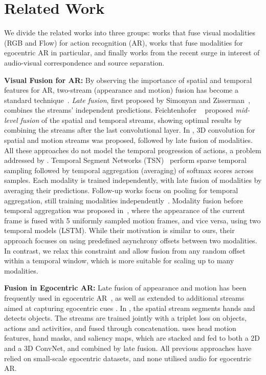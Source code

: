 \documentclass[10pt,twocolumn,letterpaper]{article}
\begin{document}
\section{Related Work}

We divide the related works into three groups: works that fuse visual modalities (RGB and Flow) for action recognition (AR), works that fuse modalities for egocentric AR in particular, and finally works from the recent surge in interest of audio-visual correspondence and source separation.

\noindent\textbf{Visual Fusion for AR:} By observing the importance of spatial and temporal features for AR, 
two-stream (appearance and motion) fusion has become a standard technique~\cite{NIPS2014_5353, Feichtenhofer_2016_CVPR, TSN2016ECCV}.
\textit{Late fusion}, first proposed by Simonyan and Zisserman~\cite{NIPS2014_5353},  combines the streams' independent predictions. Feichtenhofer \etal~\cite{Feichtenhofer_2016_CVPR} proposed \textit{mid-level fusion} of the spatial and temporal streams, showing optimal results by combining the streams after the last convolutional layer.
In \cite{Carreira_2017_CVPR}, 3D convolution for spatial and motion streams was proposed, followed by late fusion of modalities. 
All these approaches do not model the temporal progression of actions, 
a problem addressed by \cite{TSN2016ECCV}.
Temporal Segment Networks (TSN)~\cite{TSN2016ECCV} perform sparse temporal sampling followed by temporal aggregation (averaging) of softmax scores across samples. 
Each modality is trained independently, 
with late fusion of modalities by averaging their predictions.
Follow-up works focus on pooling for temporal aggregation, still training modalities independently~\cite{Zhou_2018_ECCV,Girdhar_2017_CVPR}.
Modality fusion before temporal aggregation was proposed in~\cite{async_fusion}, where the appearance of the current frame is fused with 5 uniformly sampled motion frames, and vice versa, using two temporal models (LSTM).
While their motivation is similar to ours, their approach focuses on using predefined asynchrony offsets between two modalities. In contrast, we relax this constraint and allow fusion from any random offset within a temporal window, which is more suitable for scaling up to many modalities.

\noindent\textbf{Fusion in Egocentric AR:} 
Late fusion of appearance and motion has been frequently used in egocentric AR~\cite{Damen_2018_ECCV,Song_2016_CVPR_Workshops,Moltisanti2017,Sudhakaran2018}, as well as extended to additional streams
aimed at capturing egocentric cues
\cite{Ma_2016_CVPR,Singh_2016_CVPR,Song_2016_CVPR_Workshops}. 
In \cite{Ma_2016_CVPR}, 
the spatial stream segments hands and detects objects. The streams are trained jointly with a triplet loss on objects, actions and activities, and fused through concatenation. \cite{Singh_2016_CVPR} uses head motion features, hand masks, and saliency maps, which are stacked and 
fed to both a 2D and a 3D ConvNet, and combined by late fusion. 
All previous approaches have relied on small-scale egocentric datasets, and none utilised audio for egocentric AR.
\end{document}
